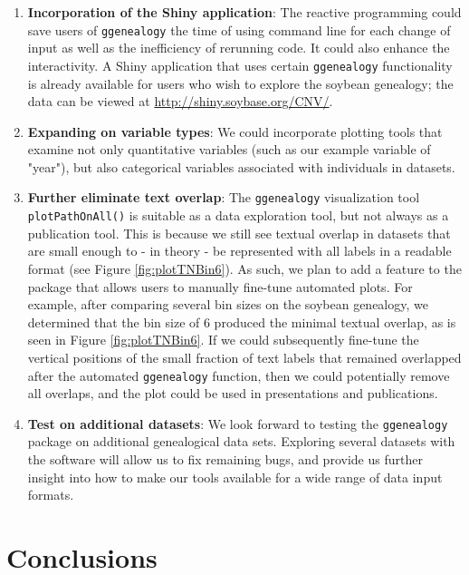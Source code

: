 \documentclass[11pt,a4paper,oldfontcommands,openany]{memoir}
\numberwithin{equation}{section} %
\newcommand{\code}[1]{{\texttt{#1}}}
\newcommand{\pkg}[1]{{\texttt{#1}}}
\begin{document}
\begin{enumerate}
\item \textbf{Incorporation of the Shiny application}: The reactive programming could save users of \pkg{ggenealogy} the time of using command line for each change of input as well as the inefficiency of rerunning code. It could also enhance the interactivity. A Shiny application that uses certain \pkg{ggenealogy} functionality is already available for users who wish to explore the soybean genealogy; the data can be viewed at \url{http://shiny.soybase.org/CNV/}.

\item \textbf{Expanding on variable types}: We could incorporate plotting tools that examine not only quantitative variables (such as our example variable of "year"), but also categorical variables associated with individuals in datasets.

\item \textbf{Further eliminate text overlap}: The \pkg{ggenealogy} visualization tool \code{plotPathOnAll()} is suitable as a data exploration tool, but not always as a publication tool. This is because we still see textual overlap in datasets that are small enough to - in theory - be represented with all labels in a readable format (see Figure \ref{fig:plotTNBin6}). As such, we plan to add a feature to the package that allows users to manually fine-tune automated plots. For example, after comparing several bin sizes on the soybean genealogy, we determined that the bin size of 6 produced the minimal textual overlap, as is seen in Figure \ref{fig:plotTNBin6}. If we could subsequently fine-tune the vertical positions of the small fraction of text labels that remained overlapped after the automated \pkg{ggenealogy} function, then we could potentially remove all overlaps, and the plot could be used in presentations and publications.

\item \textbf{Test on additional datasets}: We look forward to testing the \pkg{ggenealogy} package on additional genealogical data sets. Exploring several datasets with the software will allow us to fix remaining bugs, and provide us further insight into how to make our tools available for a wide range of data input formats. 
\end{enumerate}

\section{Conclusions}
\end{document}
